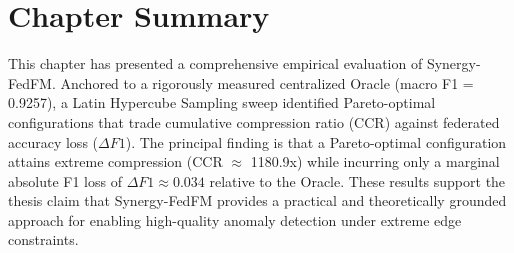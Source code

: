\section{Chapter Summary}
This chapter has presented a comprehensive empirical evaluation of Synergy-FedFM. Anchored to a rigorously measured centralized Oracle (macro F1 = 0.9257), a Latin Hypercube Sampling sweep identified Pareto-optimal configurations that trade cumulative compression ratio (CCR) against federated accuracy loss ($\Delta F1$). The principal finding is that a Pareto-optimal configuration attains extreme compression (CCR $\approx$ 1180.9x) while incurring only a marginal absolute F1 loss of $\Delta F1 \approx 0.034$ relative to the Oracle. These results support the thesis claim that Synergy-FedFM provides a practical and theoretically grounded approach for enabling high-quality anomaly detection under extreme edge constraints.
